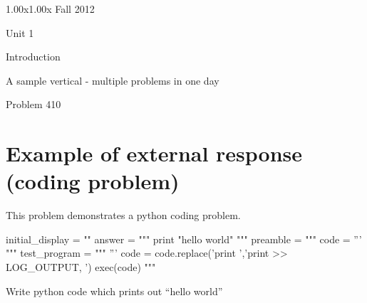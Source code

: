 \documentclass[12pt]{article}
\begin{document}
\begin{edXcourse}{1.00x}{1.00x Fall 2012}
\begin{edXchapter}{Unit 1}
\begin{edXsection}{Introduction}
\begin{edXvertical}{A sample vertical - multiple problems in one day}
\end{edXvertical}


\begin{edXproblem}{Problem 4}{10}

\section{Example of external response (coding problem)}  

This problem demonstrates a python coding problem.

\begin{edXscript}
initial_display = ""
answer = """
print "hello world"
"""
preamble = """ 
code = '''
"""
test_program = """
'''
code = code.replace('print ','print >> LOG_OUTPUT, ')
exec(code)
"""
\end{edXscript}

Write python code which prints out ``hello world''


\end{edXproblem}


\end{edXsection}
\end{edXchapter}
\end{edXcourse}

\end{document}
